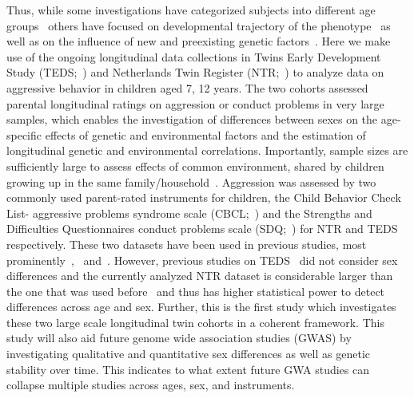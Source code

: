 Thus, while some investigations have categorized subjects into different age groups~\cite{Niv2013} others have focused on developmental trajectory of the phenotype~\cite{Pingault2015} as well as on the influence of new and preexisting genetic factors~\cite{vanBeijsterveldt2003}. 
Here we make use of the ongoing longitudinal data collections in Twins Early Development Study (TEDS;~\cite{Haworth2012}) and Netherlands Twin Register (NTR;~\cite{Willemsen2013a}) to analyze data on aggressive behavior in children aged 7, 12 years.
The two cohorts assessed parental longitudinal ratings on aggression or conduct problems in very large samples, which enables the investigation of differences between sexes on the age-specific effects of genetic and environmental factors and the estimation of longitudinal genetic and environmental correlations.
Importantly, sample sizes are sufficiently large to assess effects of common environment, shared by children growing up in the same family/household~\cite{Martin1978, Posthuma2000}. 
Aggression was assessed by two commonly used parent-rated instruments for children, the Child Behavior Check List- aggressive problems syndrome scale (CBCL;~\cite{Achenbach2003}) and the Strengths and Difficulties Questionnaires conduct problems scale (SDQ;~\cite{Goodman1997}) for NTR and TEDS respectively. 
These two datasets have been used in previous studies, most prominently~\citet{Lewis2015},~\citet{Pingault2015} and~\citet{vanBeijsterveldt2003}.
However, previous studies on TEDS~\cite{Lewis2015, Pingault2015} did not consider sex differences and the currently analyzed NTR dataset is considerable larger than the one that was used before~\cite{vanBeijsterveldt2003} and thus has higher statistical power to detect differences across age and sex.
Further, this is the first study which investigates these two large scale longitudinal twin cohorts in a coherent framework.
This study will also aid future genome wide association studies (GWAS) by investigating qualitative and quantitative sex differences as well as genetic stability over time.
This indicates to what extent future GWA studies can collapse multiple studies across ages, sex, and instruments.
